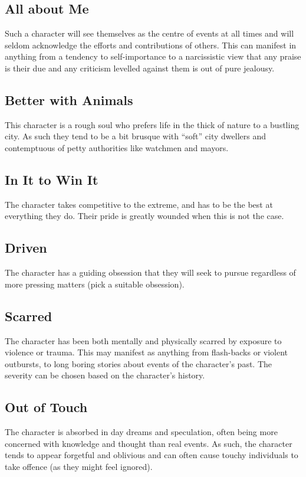 \documentclass[a4paper,10pt,oneside]{book}
\begin{document}
\subsection{All about Me}
Such a character will see themselves as the centre of events at all times and will seldom acknowledge the efforts and contributions of others. This can manifest in anything from a tendency to self-importance to a narcissistic view that any praise is their due and any criticism levelled against them is out of pure jealousy. 

\subsection{Better with Animals}
This character is a rough soul who prefers life in the thick of nature to a bustling city. As such they tend to be a bit brusque with ``soft'' city dwellers and contemptuous of petty authorities like watchmen and mayors.

\subsection{In It to Win It}
The character takes competitive to the extreme, and has to be the best at everything they do. Their pride is greatly wounded when this is not the case. 

\subsection{Driven}
The character has a guiding obsession that they will seek to pursue regardless of more pressing matters (pick a suitable obsession).

\subsection{Scarred}
The character has been both mentally and physically scarred by exposure to violence or trauma. This may manifest as anything from flash-backs or violent outbursts, to long boring stories about events of the character's past. The severity can be chosen based on the character's history.

\subsection{Out of Touch}
The character is absorbed in day dreams and speculation, often being more concerned with knowledge and thought than real events. As such, the character tends to appear forgetful and oblivious and can often cause touchy individuals to take offence (as they might feel ignored).
\end{document}
